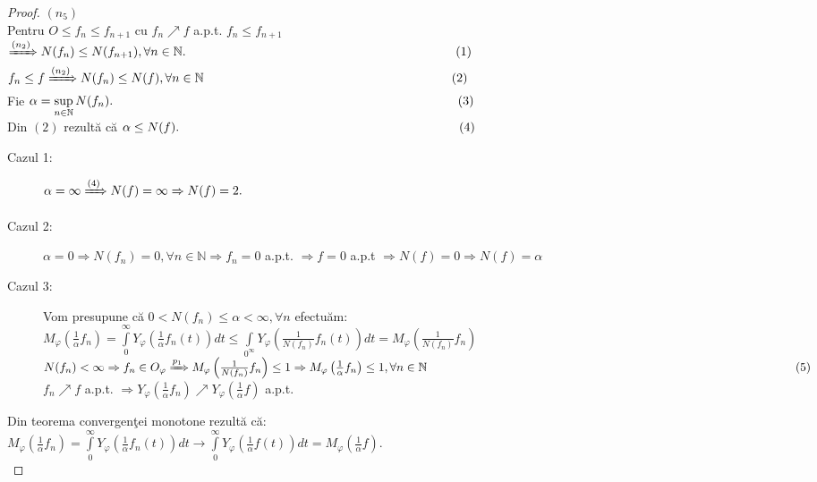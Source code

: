 \documentclass[ a4paper, 12pt]{report}
\theoremstyle{definition}
\theoremstyle{remark}
\numberwithin{equation}{section}
\begin{document}
\begin{proof}
$(n_ 5)$
\\
 Pentru $O \leq f_n \leq f_{n+1}$ cu $f_n \nearrow f$ a.p.t. $f_n \leq f_{n+1}$\\ $\xRightarrow{(n_2)} N(f_n) \leq N(f_{n+1}), \forall n \in \mathbb{N}. \hspace{76mm}(1)$\\
$f_n \leq f \xRightarrow{(n_2)} N(f_n) \leq N(f), \forall n \in \mathbb{N}$ $\hspace{68mm}  (2)$\\
Fie $\alpha = \sup\limits_{n \in \mathbb{N}}N(f_n).  \hspace{97mm} (3)$\\
Din $(2)$ rezult\u a c\u a $ \alpha \leq N(f).  \hspace{79mm} (4)$\\
\begin{description}
\item[Cazul 1:]$\alpha = \infty \xRightarrow{(4)} N(f) = \infty \Rightarrow N(f) = 2.$
\item[Cazul 2:]$\alpha = 0 \Rightarrow N(f_n) = 0, \forall n \in \mathbb{N} \Rightarrow f_n = 0$ a.p.t. $\Rightarrow f = 0$ a.p.t $\Rightarrow N(f) = 0 \Rightarrow N(f) = \alpha$
\item[Cazul 3:] Vom presupune c\u a $0<N(f_n) \leq \alpha<\infty, \forall n$ efectu\u am:\\
$M_\varphi\left (\frac{1}{\alpha}f_n\right ) = \int\limits_{0}^{\infty} Y_\varphi\left (\frac{1}{\alpha} f_n(t)\right ) dt \leq \int\limits_{0^{\infty}}Y_\varphi\left (\frac{1}{N(f_n)}f_n(t)\right ) dt = M_\varphi\left (\frac{1}{N(f_n)} f_n\right )$\\
$N(f_n) < \infty \Rightarrow f_n \in O_\varphi \xRightarrow{p_1} M_\varphi\left (\frac{1}{N(f_n)}f_n\right ) \leq 1 \Rightarrow M_\varphi\left (\frac{1}{\alpha} f_n  \right ) \leq 1,\\ \forall n \in \mathbb{N}  \hspace{108mm}  (5)$\\
$f_n \nearrow f$ a.p.t. $\Rightarrow Y_\varphi\left (\frac{1}{\alpha}f_n \right ) \nearrow Y_\varphi\left (\frac{1}{\alpha}f \right )$ a.p.t.\\
\end{description}
Din teorema convergen\c tei monotone rezult\u a c\u a: \\ $M_\varphi\left (\frac{1}{\alpha}f_n\right ) = \int\limits_{0}^{\infty}Y_\varphi\left (\frac{1}{\alpha}f_n(t)\right ) dt \rightarrow \int\limits_{0}^{\infty} Y_\varphi(\frac{1}{\alpha}f(t)) dt = M_\varphi\left (\frac{1}{\alpha}f\right ).$\\

\end{proof}
\end{document}
